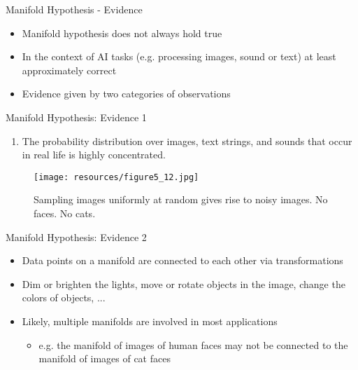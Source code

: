 \documentclass[handout]{beamer}
\begin{document}
\begin{frame}[t]{Manifold Hypothesis - Evidence}
    \begin{itemize}
        \pause
        \item Manifold hypothesis does not always hold true
        \pause
        \item In the context of AI tasks (e.g. processing images, sound or text) at least approximately correct
            \pause
        \item Evidence given by two categories of observations
    \end{itemize} 
\end{frame}

\begin{frame}[t]{Manifold Hypothesis: Evidence 1}
    \begin{enumerate}
\item The probability distribution over images, text strings, and sounds that occur in real life is highly concentrated.
    \end{enumerate}
\begin{figure}[h]
    \centering
    \texttt{[image: resources/figure5\_12.jpg]}
    \caption{Sampling images uniformly at random gives rise to noisy images. No faces. No cats.}
\end{figure}    
\end{frame}

\begin{frame}[t]{Manifold Hypothesis: Evidence 2}

\begin{itemize}
\item 
 Data points on a manifold are connected to each other via transformations
\end{itemize}
\pause
\begin{example}[Images]
   \begin{itemize}
    \item Dim or brighten the lights, move or rotate objects in the image, change the colors of objects, ...
   \end{itemize} 
\end{example}
\pause

\begin{itemize}
\item Likely, multiple manifolds are involved in most applications
    \pause
    \begin{itemize}
\item e.g. the manifold of images of human faces may not be connected to the manifold of images of cat faces
    \end{itemize}
\end{itemize}
\end{frame}
\end{document}
